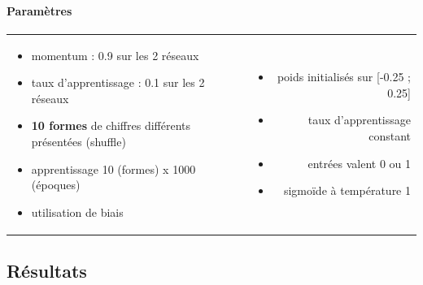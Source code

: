     \paragraph{Paramètres}
      \begin{center}
	\begin{tabular}{lr}
	  \begin{minipage}{230px}
	    \begin{itemize}
	      \item momentum : 0.9 sur les 2 réseaux
	      \item taux d'apprentissage : 0.1 sur les 2 réseaux
	      \item \textbf{10 formes} de chiffres différents présentées (shuffle)
	      \item apprentissage 10 (formes) x 1000 (époques)
	      \item utilisation de biais
	    \end{itemize}
	  \end{minipage}
	  &
	  \begin{minipage}{230px}
	    \begin{itemize}
	      \item poids initialisés sur [-0.25 ; 0.25]
	      \item taux d'apprentissage constant
	      \item entrées valent 0 ou 1
	      \item sigmoïde à température 1
	    \end{itemize}
	  \end{minipage}
	\end{tabular}
      \end{center}

  
  \newpage
  \subsection{Résultats}

